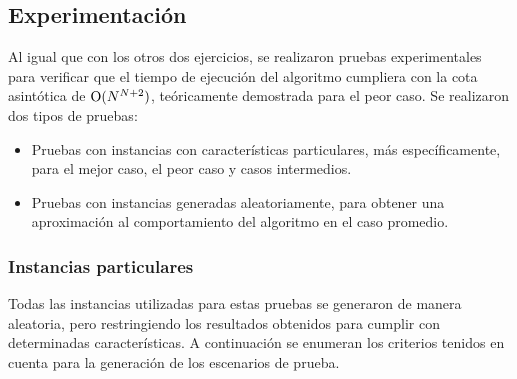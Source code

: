        


    \subsection{Experimentación}

        Al igual que con los otros dos ejercicios, se realizaron pruebas experimentales para verificar que el tiempo de ejecución del algoritmo cumpliera con la cota asintótica de $\operatorname{O}(N^{N+2})$, teóricamente demostrada para el peor caso. Se realizaron dos tipos de pruebas:
        
        \begin{itemize}
            \item Pruebas con instancias con características particulares, más específicamente, para el mejor caso, el peor caso y casos intermedios.
            \item Pruebas con instancias generadas aleatoriamente, para obtener una aproximación al comportamiento del algoritmo en el caso promedio.
        \end{itemize}

        \subsubsection{Instancias particulares}

            Todas las instancias utilizadas para estas pruebas se generaron de manera aleatoria, pero restringiendo los resultados obtenidos para cumplir con determinadas características. A continuación se enumeran los criterios tenidos en cuenta para la generación de los escenarios de prueba.

